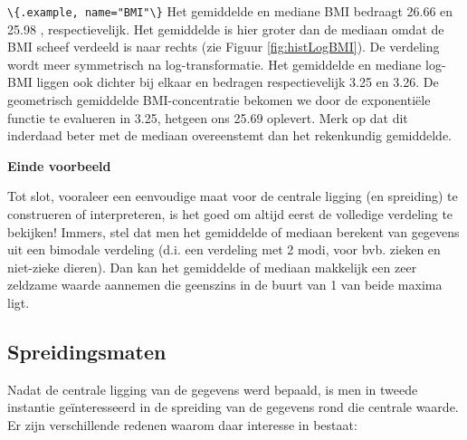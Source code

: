 \documentclass[
  12pt,dutch,coursenotes]{book}
\newcommand{\passthrough}[1]{#1}
\begin{document}
\passthrough{\lstinline!\{.example, name="BMI"\}!}
Het gemiddelde en mediane BMI bedraagt 26.66 en 25.98 , respectievelijk. Het gemiddelde is hier groter dan de mediaan omdat de BMI scheef verdeeld is naar rechts (zie Figuur \ref{fig:histLogBMI}). De verdeling wordt meer symmetrisch na log-transformatie. Het gemiddelde en mediane log-BMI liggen ook dichter bij elkaar en bedragen respectievelijk 3.25 en 3.26. De geometrisch gemiddelde BMI-concentratie bekomen we door de exponentiële functie te evalueren in 3.25, hetgeen ons 25.69 oplevert. Merk op dat dit inderdaad beter met de mediaan overeenstemt dan het rekenkundig gemiddelde.

\textbf{Einde voorbeeld}

Tot slot, vooraleer een eenvoudige maat voor de centrale ligging (en
spreiding) te construeren of interpreteren, is het goed om altijd eerst de
volledige verdeling te bekijken! Immers, stel dat men het gemiddelde of
mediaan berekent van gegevens uit een bimodale verdeling (d.i. een verdeling
met 2 modi, voor bvb. zieken en niet-zieke dieren). Dan kan het gemiddelde of
mediaan makkelijk een zeer zeldzame waarde aannemen die geenszins in de
buurt van 1 van beide maxima ligt.

\hypertarget{subsec:spreiding}{%
\subsection{Spreidingsmaten}\label{subsec:spreiding}}

Nadat de centrale ligging van de gegevens werd bepaald, is men in tweede
instantie geïnteresseerd in de spreiding van de gegevens rond
die centrale waarde. Er zijn verschillende redenen waarom daar interesse in bestaat:
\end{document}

